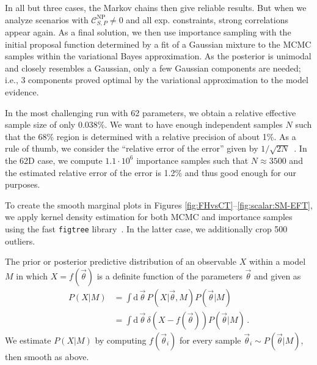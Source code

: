 \documentclass[twocolumn,epjc3]{svjour3}
\numberwithin{equation}{section}
\def \nn{\nonumber\\}
\newcommand{\wilson}[2][{}]{\mathcal{C}_{#2}^{\mathrm{#1}}}
\renewcommand{\[}{\big[}
\renewcommand{\]}{\big]}
\renewcommand{\(}{\big(}
\renewcommand{\)}{\big)}
\def \vecth{\vec{\theta}}
\newcommand\rmdx[1]{\mbox{d} \, #1 \,}
\begin{document}
In all but three cases, the Markov chains then give reliable results. But when
we analyze scenarios with $\wilson[NP]{S,P} \ne 0$ and all exp.  constraints,
strong correlations appear again. As a final solution, we then use importance
sampling with the initial proposal function determined by a fit of a Gaussian
mixture to the MCMC samples within the variational Bayes approximation. As the
posterior is unimodal and closely resembles a Gaussian, only a few Gaussian
components are needed; i.e., 3 components proved optimal by the variational
approximation to the model evidence.

In the most challenging run with 62 parameters, we obtain a relative effective
sample size of only 0.038\%. We want to have enough independent samples $N$ such
that the 68\% region is determined with a relative precision of about 1\%. As a
rule of thumb, we consider the ``relative error of the error'' given by
$1/\sqrt{2 N}$~\cite[ch. 37]{Agashe:2014kda}.  In the 62D case, we compute
$1.1\cdot10^6$ importance samples such that $N \approx 3500$ and the estimated
relative error of the error is 1.2\% and thus good enough for our purposes.

To create the smooth marginal plots in Figures
\ref{fig:FHvsCT}--\ref{fig:scalar:SM-EFT}, we apply kernel density estimation
for both MCMC and importance samples using the fast \texttt{figtree}
library~\cite{morariu08figtree}. In the latter case, we additionally crop 500
outliers.

The prior or posterior predictive distribution of an observable $X$ within a
model $M$ in which $X=f(\vecth)$ is a definite function of the
parameters $\vecth$ {and} given as
\begin{align}
  \label{eq:predictive}
  P(X | M) &= \int \rmdx{\vecth} P(X|\vecth,M) P(\vecth|M)\nn
  &= \int \rmdx{\vecth} \delta(X - f(\vecth)) P(\vecth|M) \,.
\end{align}
We estimate $P(X|M)$ by computing $f(\vecth_i)$ for every sample $\vecth_i \sim
P(\vecth|M)$, then smooth as above.

%
%
%

%
%



\end{document}
